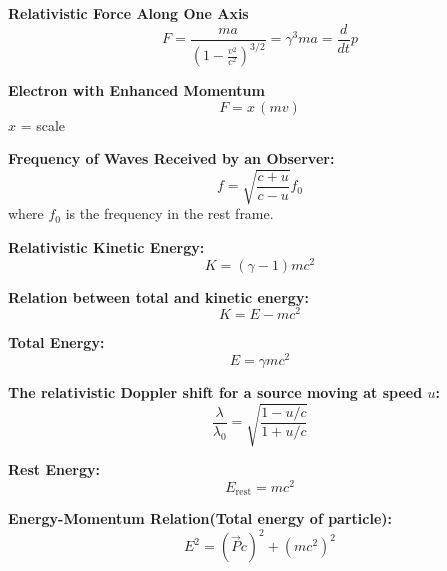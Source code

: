 \documentclass[a4paper,11pt]{article}
\renewcommand{\textbf}[1]{{\scriptsize	\bfseries #1}}
\begin{document}
\begin{footnotesize}
\begin{multicols}{2}
\begin{minipage}{\linewidth}
\textbf{Relativistic Force Along One Axis}
    \[
    F = \frac{ma}{(1 - \frac{v^2}{c^2})^{3/2}} = \gamma^3 ma = \frac{d}{dt}p
    \]

\textbf{ Electron with Enhanced Momentum}
    \[ 
    F  = x\, (mv)
    \]
    $x$ = scale
\end{minipage}
\begin{minipage}{\linewidth}
\textbf{Frequency of Waves Received by an Observer:} 
\[
f = \sqrt{\frac{c+u}{c-u}}f_0
\]
where \( f_0 \) is the frequency in the rest frame.
\end{minipage}

\begin{minipage}{\linewidth}

\textbf{Relativistic Kinetic Energy:} \\[-0.2cm]
\[
K = (\gamma - 1)mc^2
\]
\end{minipage}
\begin{minipage}{\linewidth}

\textbf{Relation between total and kinetic energy:} \\[-0.2cm]
\[
K = E - mc^2
\]

\end{minipage}

\begin{minipage}{\linewidth}

\textbf{Total Energy:} \\[-0.2cm]
\[
E = \gamma mc^2
\]

\end{minipage}


\textbf{The relativistic Doppler shift for a source moving at speed \(u\):}
\[
\frac{\lambda}{\lambda_0} = \sqrt{\frac{1 - u/c}{1 + u/c}}
\]

\begin{minipage}{\linewidth}

\textbf{Rest Energy:} \\[-0.2cm]
\[
E_{\text{rest}} = mc^2
\]

\end{minipage}


\begin{minipage}{\linewidth}

\textbf{Energy-Momentum Relation(Total energy of particle):} \\[-0.2cm]
\[
E^2 = (\vec{P}c)^2 + (mc^2)^2
\]

\end{minipage}


\end{multicols}
\end{footnotesize}
\end{document}
